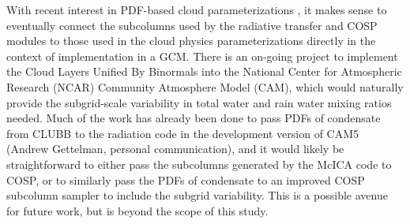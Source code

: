 \documentclass[letter]{article}
\begin{document}
With recent interest in PDF-based cloud parameterizations \citep[e.g.,][]{tompkins_2002}, it makes sense to eventually connect the subcolumns used by the radiative transfer and COSP modules to those used in the cloud physics parameterizations directly in the context of implementation in a GCM. There is an on-going project to implement the Cloud Layers Unified By Binormals \citep[CLUBB][]{golaz_et_al_2002} into the National Center for Atmospheric Research (NCAR) Community Atmosphere Model (CAM), which would naturally provide the subgrid-scale variability in total water and rain water mixing ratios needed. Much of the work has already been done to pass PDFs of condensate from CLUBB to the radiation code in the development version of CAM5 (Andrew Gettelman, personal communication), and it would likely be straightforward to either pass the subcolumns generated by the McICA code to COSP, or to similarly pass the PDFs of condensate to an improved COSP subcolumn sampler to include the subgrid variability. This is a possible avenue for future work, but is beyond the scope of this study.

\end{document}
